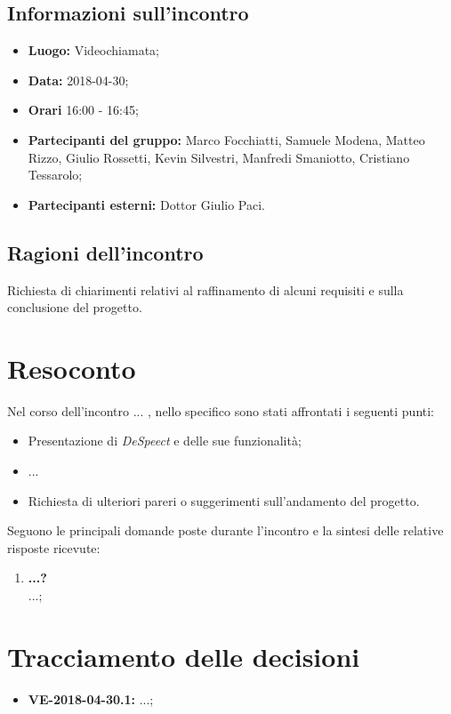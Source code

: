 \documentclass[openany,12pt,a4paper]{article}
\begin{document}
  \subsection{Informazioni sull'incontro} 
   
  \begin{itemize}  
      \item \textbf{Luogo:} Videochiamata;
      \item \textbf{Data:} 2018-04-30; 
      \item \textbf{Orari} 16:00 - 16:45;
      \item \textbf{Partecipanti del gruppo:} Marco Focchiatti, Samuele Modena, Matteo Rizzo, Giulio Rossetti, Kevin Silvestri, Manfredi Smaniotto, Cristiano Tessarolo; 
      \item \textbf{Partecipanti esterni:} Dottor Giulio Paci. 
  \end{itemize} 
 
  \subsection{Ragioni dell'incontro} 
  Richiesta di chiarimenti relativi al raffinamento di alcuni requisiti e sulla conclusione del progetto. 
 
  \section{Resoconto} 
  Nel corso dell'incontro ... , nello specifico sono stati affrontati i seguenti punti:
	
  \begin{itemize}
  	
	\item Presentazione di \textit{DeSpeect} e delle sue funzionalità;
	\item ...
	\item Richiesta di ulteriori pareri o suggerimenti sull'andamento del progetto.
	
  \end{itemize}
	
  \noindent Seguono le principali domande poste durante l'incontro e la sintesi delle relative risposte ricevute:

  \begin{enumerate}
  	
  	\item \textbf{...?} \\
  	...;
  	
  \end{enumerate} 
 
  \section{Tracciamento delle decisioni} 
   
  \begin{itemize} 
  	
      \item \textbf{VE-2018-04-30.1:} ...;
      
  \end{itemize} 
   
  
\end{document}
